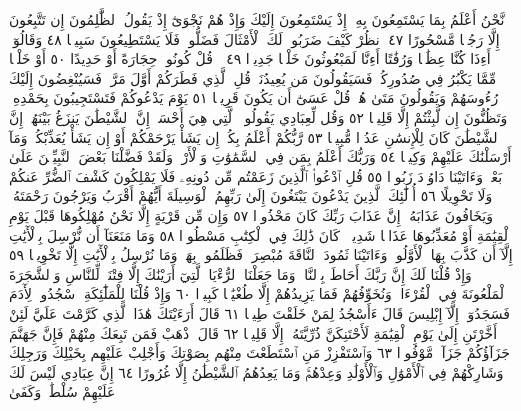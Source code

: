 نَّحْنُ أَعْلَمُ بِمَا يَسْتَمِعُونَ بِهِۦٓ إِذْ يَسْتَمِعُونَ إِلَيْكَ وَإِذْ هُمْ نَجْوَىٰٓ
إِذْ يَقُولُ ٱلظَّٰلِمُونَ إِن تَتَّبِعُونَ إِلَّا رَجُلࣰا مَّسْحُورًا ٤٧ ٱنظُرْ
كَيْفَ ضَرَبُوا۟ لَكَ ٱلْأَمْثَالَ فَضَلُّوا۟ فَلَا يَسْتَطِيعُونَ سَبِيلࣰا ٤٨
وَقَالُوٓا۟ أَءِذَا كُنَّا عِظَٰمࣰا وَرُفَٰتًا أَءِنَّا لَمَبْعُوثُونَ خَلْقࣰا جَدِيدࣰا ٤٩
۞ قُلْ كُونُوا۟ حِجَارَةً أَوْ حَدِيدًا ٥٠ أَوْ خَلْقࣰا مِّمَّا يَكْبُرُ فِي
صُدُورِكُمْۚ فَسَيَقُولُونَ مَن يُعِيدُنَاۖ قُلِ ٱلَّذِي فَطَرَكُمْ أَوَّلَ مَرَّةࣲۚ
فَسَيُنْغِضُونَ إِلَيْكَ رُءُوسَهُمْ وَيَقُولُونَ مَتَىٰ هُوَۖ قُلْ عَسَىٰٓ أَن
يَكُونَ قَرِيبࣰا ٥١ يَوْمَ يَدْعُوكُمْ فَتَسْتَجِيبُونَ بِحَمْدِهِۦ وَتَظُنُّونَ
إِن لَّبِثْتُمْ إِلَّا قَلِيلࣰا ٥٢ وَقُل لِّعِبَادِي يَقُولُوا۟ ٱلَّتِي هِيَ أَحْسَنُۚ
إِنَّ ٱلشَّيْطَٰنَ يَنزَغُ بَيْنَهُمْۚ إِنَّ ٱلشَّيْطَٰنَ كَانَ لِلْإِنسَٰنِ عَدُوࣰّا
مُّبِينࣰا ٥٣ رَّبُّكُمْ أَعْلَمُ بِكُمْۖ إِن يَشَأْ يَرْحَمْكُمْ أَوْ إِن يَشَأْ
يُعَذِّبْكُمْۚ وَمَآ أَرْسَلْنَٰكَ عَلَيْهِمْ وَكِيلࣰا ٥٤ وَرَبُّكَ أَعْلَمُ
بِمَن فِي ٱلسَّمَٰوَٰتِ وَٱلْأَرْضِۗ وَلَقَدْ فَضَّلْنَا بَعْضَ ٱلنَّبِيِّـۧنَ عَلَىٰ
بَعْضࣲۖ وَءَاتَيْنَا دَاوُۥدَ زَبُورࣰا ٥٥ قُلِ ٱدْعُوا۟ ٱلَّذِينَ زَعَمْتُم مِّن
دُونِهِۦ فَلَا يَمْلِكُونَ كَشْفَ ٱلضُّرِّ عَنكُمْ وَلَا تَحْوِيلًا ٥٦ أُو۟لَٰٓئِكَ
ٱلَّذِينَ يَدْعُونَ يَبْتَغُونَ إِلَىٰ رَبِّهِمُ ٱلْوَسِيلَةَ أَيُّهُمْ أَقْرَبُ
وَيَرْجُونَ رَحْمَتَهُۥ وَيَخَافُونَ عَذَابَهُۥٓۚ إِنَّ عَذَابَ رَبِّكَ كَانَ
مَحْذُورࣰا ٥٧ وَإِن مِّن قَرْيَةٍ إِلَّا نَحْنُ مُهْلِكُوهَا قَبْلَ يَوْمِ ٱلْقِيَٰمَةِ
أَوْ مُعَذِّبُوهَا عَذَابࣰا شَدِيدࣰاۚ كَانَ ذَٰلِكَ فِي ٱلْكِتَٰبِ مَسْطُورࣰا ٥٨
وَمَا مَنَعَنَآ أَن نُّرْسِلَ بِٱلْأٓيَٰتِ إِلَّآ أَن كَذَّبَ بِهَا ٱلْأَوَّلُونَۚ
وَءَاتَيْنَا ثَمُودَ ٱلنَّاقَةَ مُبْصِرَةࣰ فَظَلَمُوا۟ بِهَاۚ وَمَا نُرْسِلُ بِٱلْأٓيَٰتِ
إِلَّا تَخْوِيفࣰا ٥٩ وَإِذْ قُلْنَا لَكَ إِنَّ رَبَّكَ أَحَاطَ بِٱلنَّاسِۚ وَمَا جَعَلْنَا
ٱلرُّءْيَا ٱلَّتِيٓ أَرَيْنَٰكَ إِلَّا فِتْنَةࣰ لِّلنَّاسِ وَٱلشَّجَرَةَ ٱلْمَلْعُونَةَ
فِي ٱلْقُرْءَانِۚ وَنُخَوِّفُهُمْ فَمَا يَزِيدُهُمْ إِلَّا طُغْيَٰنࣰا كَبِيرࣰا ٦٠
وَإِذْ قُلْنَا لِلْمَلَٰٓئِكَةِ ٱسْجُدُوا۟ لِأٓدَمَ فَسَجَدُوٓا۟ إِلَّآ إِبْلِيسَ
قَالَ ءَأَسْجُدُ لِمَنْ خَلَقْتَ طِينࣰا ٦١ قَالَ أَرَءَيْتَكَ هَٰذَا ٱلَّذِي
كَرَّمْتَ عَلَيَّ لَئِنْ أَخَّرْتَنِ إِلَىٰ يَوْمِ ٱلْقِيَٰمَةِ لَأَحْتَنِكَنَّ
ذُرِّيَّتَهُۥٓ إِلَّا قَلِيلࣰا ٦٢ قَالَ ٱذْهَبْ فَمَن تَبِعَكَ مِنْهُمْ فَإِنَّ
جَهَنَّمَ جَزَآؤُكُمْ جَزَآءࣰ مَّوْفُورࣰا ٦٣ وَٱسْتَفْزِزْ مَنِ ٱسْتَطَعْتَ
مِنْهُم بِصَوْتِكَ وَأَجْلِبْ عَلَيْهِم بِخَيْلِكَ وَرَجِلِكَ وَشَارِكْهُمْ
فِي ٱلْأَمْوَٰلِ وَٱلْأَوْلَٰدِ وَعِدْهُمْۚ وَمَا يَعِدُهُمُ ٱلشَّيْطَٰنُ إِلَّا
غُرُورًا ٦٤ إِنَّ عِبَادِي لَيْسَ لَكَ عَلَيْهِمْ سُلْطَٰنࣱۚ وَكَفَىٰ
